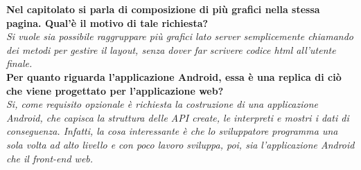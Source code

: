 	\textbf{Nel capitolato si parla di composizione di più grafici nella stessa pagina. Qual'è il motivo di tale richiesta?}\\
	\textit{Si vuole sia possibile raggruppare più grafici lato server semplicemente chiamando dei metodi per gestire il layout, senza dover far scrivere codice html all'utente finale.}\\
	
	\textbf{Per quanto riguarda l'applicazione Android, essa è una replica di ciò che viene progettato per l'applicazione web?}\\
	\textit{Si, come requisito opzionale è richiesta la costruzione di una applicazione Android, che capisca la struttura delle API create, le interpreti e mostri i dati di conseguenza. Infatti, la cosa interessante è che lo sviluppatore programma una sola volta ad alto livello e con poco lavoro sviluppa, poi, sia l'applicazione Android che il front-end web.}\\